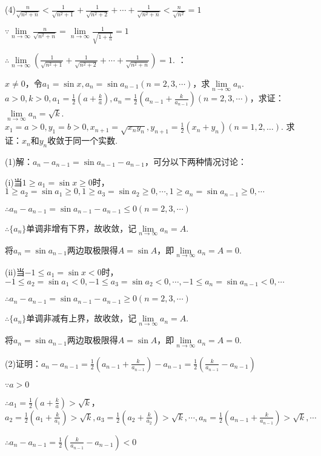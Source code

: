 \documentclass[12pt,UTF8]{ctexart}
\begin{document}
\begin{enumerate}
(4)$\frac n{\sqrt{n^2+n}}<\frac1{\sqrt{n^2+1}}+\frac1{\sqrt{n^2+2}}+\cdots+\frac 1{\sqrt{n^2+n}}<\frac n{\sqrt{n^2}}=1$

$\because\lim\limits_{n\rightarrow\infty}\frac n{\sqrt{n^2+n}}=\lim\limits_{n\rightarrow\infty}\frac 1{\sqrt{1+\frac1n}}=1$

$\therefore\lim\limits_{n\rightarrow\infty}(\frac1{\sqrt{n^2+1}}+\frac1{\sqrt{n^2+2}}+\cdots+\frac 1{\sqrt{n^2+n}})=1$.
：
	\begin{enumerate}[(1)]
		$x\neq0$，令$a_1=\sin x,a_n=\sin a_{n-1}(n=2,3,\cdots)$，求$\lim\limits_{n\rightarrow\infty}a_n$.
		$a>0,k>0,a_1=\frac12(a+\frac ka),a_n=\frac12(a_{n-1}+\frac k{a_{n-1}})(n=2,3,\cdots)$，求证：$\lim\limits_{n\rightarrow\infty}a_n=\sqrt k$.
		$x_1=a>0,y_1=b>0,x_{n+1}=\sqrt{x_ny_n},y_{n+1}=\frac12(x_n+y_n)(n=1,2,\dots)$. 求证：${x_n}$和${y_n}$收敛于同一个实数.
	\end{enumerate}
(1)解：$a_n-a_{n-1}=\sin a_{n-1}-a_{n-1}$，可分以下两种情况讨论：

(i)当$1\geq a_1=\sin x\geq0$时，$1\geq a_2=\sin a_1\geq0,1\geq a_3=\sin a_2\geq0,\cdots,1\geq a_n=\sin a_{n-1}\geq0,\cdots$

$\therefore a_n-a_{n-1}=\sin a_{n-1}-a_{n-1}\leq0(n=2,3,\cdots)$

$\therefore\{a_n\}$单调非增有下界，故收敛，记$\lim\limits_{n\rightarrow\infty}a_n=A$.

将$a_n=\sin a_{n-1}$两边取极限得$A=\sin A$，即$\lim\limits_{n\rightarrow\infty}a_n=A=0$.

(ii)当$-1\leq a_1=\sin x<0$时，$-1\leq a_2=\sin a_1<0,-1\leq a_3=\sin a_2<0,\cdots,-1\leq a_n=\sin a_{n-1}<0,\cdots$

$\therefore a_n-a_{n-1}=\sin a_{n-1}-a_{n-1}\geq0(n=2,3,\cdots)$

$\therefore\{a_n\}$单调非减有上界，故收敛，记$\lim\limits_{n\rightarrow\infty}a_n=A$.

将$a_n=\sin a_{n-1}$两边取极限得$A=\sin A$，即$\lim\limits_{n\rightarrow\infty}a_n=A=0$.

(2)证明：$a_n-a_{n-1}=\frac12(a_{n-1}+\frac k{a_{n-1}})-a_{n-1}=\frac12(\frac k{a_{n-1}}-a_{n-1})$

$\because a>0$

$\therefore a_1=\frac12(a+\frac ka)>\sqrt k$，$a_2=\frac12(a_1+\frac k{a_1})>\sqrt k,a_3=\frac12(a_2+\frac k{a_2})>\sqrt k,\cdots,a_n=\frac12(a_{n-1}+\frac k{a_{n-1}})>\sqrt k,\cdots$

$\therefore a_n-a_{n-1}=\frac12(\frac k{a_{n-1}}-a_{n-1})<0$


\end{enumerate}
\end{document}
